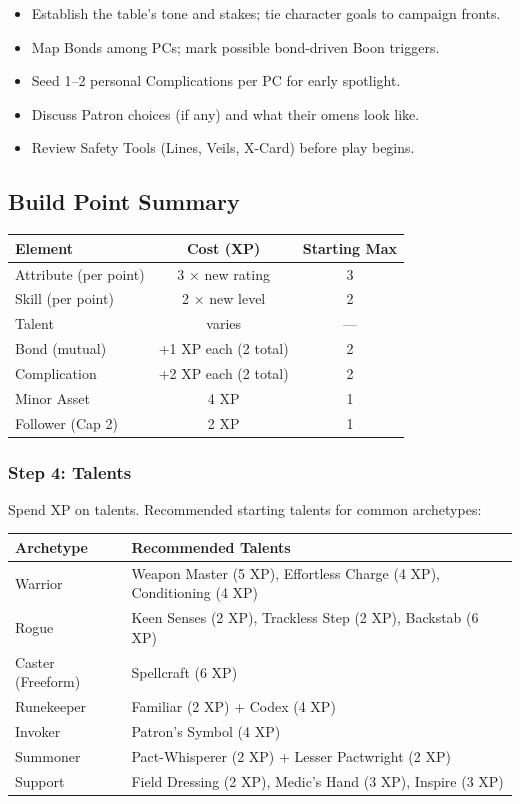 \begin{itemize}
  \item Establish the table's tone and stakes; tie character goals to campaign fronts.
  \item Map Bonds among PCs; mark possible bond-driven Boon triggers.
  \item Seed 1--2 personal Complications per PC for early spotlight.
  \item Discuss Patron choices (if any) and what their omens look like.
  \item Review Safety Tools (Lines, Veils, X-Card) before play begins.
\end{itemize}

\subsection{Build Point Summary}

\begin{tabular}{@{}lcc@{}}
\toprule
\textbf{Element} & \textbf{Cost (XP)} & \textbf{Starting Max} \\
\midrule
Attribute (per point) & 3 × new rating & 3 \\
Skill (per point) & 2 × new level & 2 \\
Talent & varies & --- \\
Bond (mutual) & +1 XP each (2 total) & 2 \\
Complication & +2 XP each (2 total) & 2 \\
Minor Asset & 4 XP & 1 \\
Follower (Cap 2) & 2 XP & 1 \\
\bottomrule
\end{tabular}


\subsubsection{Step 4: Talents}
Spend XP on talents. Recommended starting talents for common archetypes:

\begin{tabular}{@{}ll@{}}
\toprule
\textbf{Archetype} & \textbf{Recommended Talents} \\
\midrule
Warrior & Weapon Master (5 XP), Effortless Charge (4 XP), Conditioning (4 XP) \\
Rogue & Keen Senses (2 XP), Trackless Step (2 XP), Backstab (6 XP) \\
Caster (Freeform) & Spellcraft (6 XP) \\
Runekeeper & Familiar (2 XP) + Codex (4 XP) \\
Invoker & Patron's Symbol (4 XP) \\
Summoner & Pact-Whisperer (2 XP) + Lesser Pactwright (2 XP) \\
Support & Field Dressing (2 XP), Medic's Hand (3 XP), Inspire (3 XP) \\
\bottomrule
\end{tabular}

